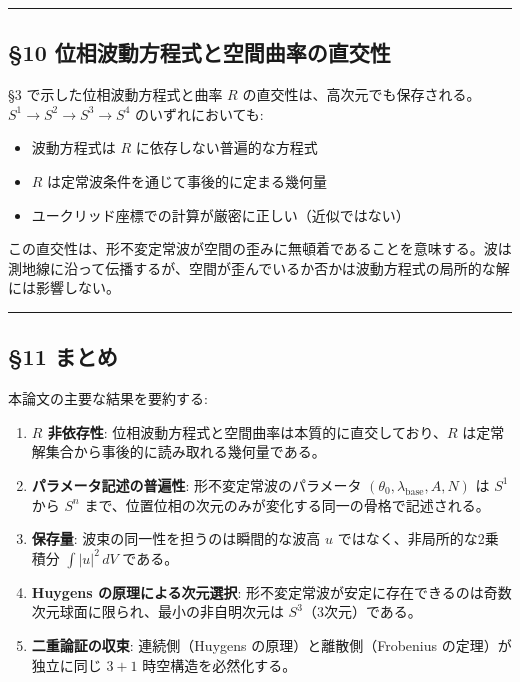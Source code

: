 \documentclass[
  a4paper,11pt]{ltjsarticle}
\providecommand{\tightlist}{%
  \setlength{\itemsep}{0pt}\setlength{\parskip}{0pt}}
\theoremstyle{definition}
\theoremstyle{remark}
\begin{document}
\begin{center}\rule{0.5\linewidth}{0.5pt}\end{center}

\subsection{§10
位相波動方程式と空間曲率の直交性}\label{ux4f4dux76f8ux6ce2ux52d5ux65b9ux7a0bux5f0fux3068ux7a7aux9593ux66f2ux7387ux306eux76f4ux4ea4ux6027}

§3 で示した位相波動方程式と曲率 \(R\)
の直交性は、高次元でも保存される。\(S^1 \to S^2 \to S^3 \to S^4\)
のいずれにおいても:

\begin{itemize}
\tightlist
\item
  波動方程式は \(R\) に依存しない普遍的な方程式
\item
  \(R\) は定常波条件を通じて事後的に定まる幾何量
\item
  ユークリッド座標での計算が厳密に正しい（近似ではない）
\end{itemize}

この直交性は、形不変定常波が空間の歪みに無頓着であることを意味する。波は測地線に沿って伝播するが、空間が歪んでいるか否かは波動方程式の局所的な解には影響しない。

\begin{center}\rule{0.5\linewidth}{0.5pt}\end{center}

\subsection{§11 まとめ}\label{ux307eux3068ux3081}

本論文の主要な結果を要約する:

\begin{enumerate}
\def\labelenumi{\arabic{enumi}.}
\item
  \textbf{\(R\) 非依存性}:
  位相波動方程式と空間曲率は本質的に直交しており、\(R\)
  は定常解集合から事後的に読み取れる幾何量である。
\item
  \textbf{パラメータ記述の普遍性}: 形不変定常波のパラメータ
  \((\theta_0, \lambda_{\text{base}}, A, N)\) は \(S^1\) から \(S^n\)
  まで、位置位相の次元のみが変化する同一の骨格で記述される。
\item
  \textbf{保存量}: 波束の同一性を担うのは瞬間的な波高 \(u\)
  ではなく、非局所的な2乗積分 \(\int |u|^2 \, dV\) である。
\item
  \textbf{Huygens の原理による次元選択}:
  形不変定常波が安定に存在できるのは奇数次元球面に限られ、最小の非自明次元は
  \(S^3\)（3次元）である。
\item
  \textbf{二重論証の収束}: 連続側（Huygens の原理）と離散側（Frobenius
  の定理）が独立に同じ \(3+1\) 時空構造を必然化する。
\end{enumerate}
\end{document}
